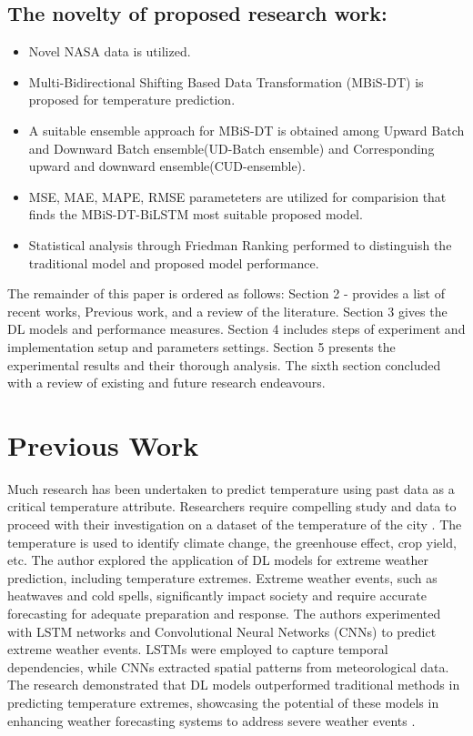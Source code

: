 \documentclass[sn-mathphys,Numbered]{sn-jnl}
\theoremstyle{thmstyleone}
\theoremstyle{thmstyletwo}
\theoremstyle{thmstylethree}
\begin{document}
\subsection{The novelty of proposed research work:}

\begin{itemize}
\item Novel NASA data is utilized.
\item Multi-Bidirectional Shifting Based Data Transformation (MBiS-DT) is proposed for temperature prediction.
\item A suitable ensemble approach for MBiS-DT is obtained among Upward Batch and Downward Batch ensemble(UD-Batch ensemble) and Corresponding upward and downward ensemble(CUD-ensemble).
\item MSE, MAE, MAPE, RMSE parameteters are utilized for comparision that finds the MBiS-DT-BiLSTM most suitable proposed model.
\item Statistical analysis through Friedman Ranking performed to distinguish the traditional model and proposed model performance.
\end{itemize}
The remainder of this paper is ordered as follows: Section 2 - provides a list of recent works, Previous work, and a review of the literature. Section 3 gives the DL models and performance measures. Section 4 includes steps of experiment and implementation setup and parameters settings. Section 5 presents the experimental results and their thorough analysis. The sixth section concluded with a review of existing and future research endeavours.

\section{Previous Work}
Much research has been undertaken to predict temperature using past data as a critical temperature attribute. Researchers require compelling study and data to proceed with their investigation on a dataset of the temperature of the city \cite{cifuentes2020air}. The temperature is used to identify climate change, the greenhouse effect, crop yield, etc.
\cite{2019AGUFMGC33A..05P}The author explored the application of DL models for extreme weather prediction, including temperature extremes. Extreme weather events, such as heatwaves and cold spells, significantly impact society and require accurate forecasting for adequate preparation and response. The authors experimented with LSTM networks and Convolutional Neural Networks (CNNs) to predict extreme weather events. LSTMs were employed to capture temporal dependencies, while CNNs extracted spatial patterns from meteorological data. The research demonstrated that DL models outperformed traditional methods in predicting temperature extremes, showcasing the potential of these models in enhancing weather forecasting systems to address severe weather events \cite{miao2020application} \cite{hou2022prediction}.
\end{document}
